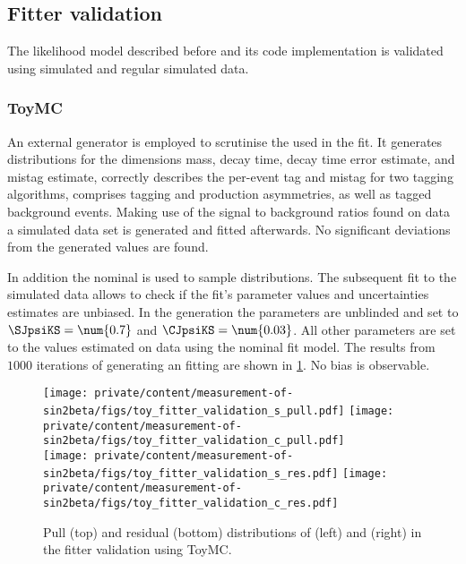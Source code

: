 \subsection{Fitter validation}
\label{sec:measurement_of_sin2beta:likelihood_fit:validation}

The likelihood model described before and its code implementation is validated
using \ToyMC simulated and regular \MC simulated data.

\subsubsection{\Acl{ToyMC}}
\label{sec:measurement_of_sin2beta:likelihood_fit:validation:toy_mc}

An external \ToyMC generator is employed to scrutinise the \PDF used in the fit.
It generates distributions for the dimensions mass, decay time, decay time error
estimate, and mistag estimate, correctly describes the per-event tag and mistag
for two tagging algorithms, comprises tagging and production asymmetries, as
well as tagged background events. Making use of the signal to background ratios
found on data a simulated data set is generated and fitted afterwards. No
significant deviations from the generated values are found.

In addition the nominal \PDF is used to sample distributions. The subsequent fit
to the simulated data allows to check if the fit's parameter values and
uncertainties estimates are unbiased. In the generation the \CP parameters are
unblinded and set to $\SJpsiKS = \num{0.7}$ and $\CJpsiKS = \num{0.03}$. All
other parameters are set to the values estimated on data using the nominal fit
model. The results from $\num{1000}$ iterations of generating an fitting are
shown in \cref{fig:measurement_of_sin2beta:likelihood_fit:validation:toy_mc}. No
bias is observable.
%
\begin{figure}[ht]
\centering
\texttt{[image: private/content/measurement-of-sin2beta/figs/toy\_fitter\_validation\_s\_pull.pdf]}
\texttt{[image: private/content/measurement-of-sin2beta/figs/toy\_fitter\_validation\_c\_pull.pdf]}     \\
\texttt{[image: private/content/measurement-of-sin2beta/figs/toy\_fitter\_validation\_s\_res.pdf]}
\texttt{[image: private/content/measurement-of-sin2beta/figs/toy\_fitter\_validation\_c\_res.pdf]}
\caption{Pull (top) and residual (bottom) distributions of \SJpsiKS (left) and
\CJpsiKS (right) in the fitter validation using \ac{ToyMC}.}
\label{fig:measurement_of_sin2beta:likelihood_fit:validation:toy_mc}
\end{figure}

